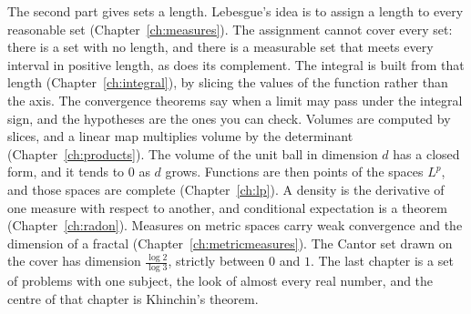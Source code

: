 The second part gives sets a length. Lebesgue's idea is to assign a length to every reasonable set (Chapter~\ref{ch:measures}). The assignment cannot cover every set: there is a set with no length, and there is a measurable set that meets every interval in positive length, as does its complement. The integral is built from that length (Chapter~\ref{ch:integral}), by slicing the values of the function rather than the axis. The convergence theorems say when a limit may pass under the integral sign, and the hypotheses are the ones you can check. Volumes are computed by slices, and a linear map multiplies volume by the determinant (Chapter~\ref{ch:products}). The volume of the unit ball in dimension $d$ has a closed form, and it tends to $0$ as $d$ grows. Functions are then points of the spaces $L^p$, and those spaces are complete (Chapter~\ref{ch:lp}). A density is the derivative of one measure with respect to another, and conditional expectation is a theorem (Chapter~\ref{ch:radon}). Measures on metric spaces carry weak convergence and the dimension of a fractal (Chapter~\ref{ch:metricmeasures}). The Cantor set drawn on the cover has dimension $\frac{\log2}{\log3}$, strictly between $0$ and $1$. The last chapter is a set of problems with one subject, the look of almost every real number, and the centre of that chapter is Khinchin's theorem.

